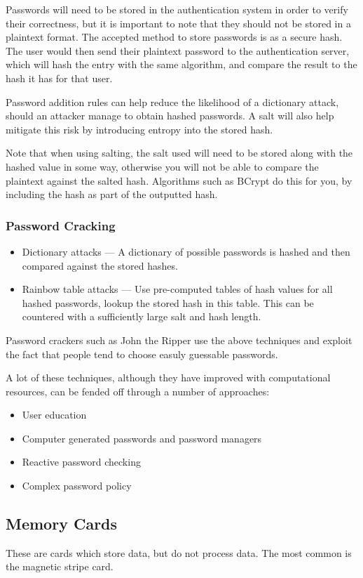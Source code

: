 Passwords will need to be stored in the authentication system in order to verify their
correctness, but it is important to note that they should not be stored in a plaintext
format. The accepted method to store passwords is as a secure hash. The user would then
send their plaintext password to the authentication server, which will hash the entry with
the same algorithm, and compare the result to the hash it has for that user.

Password addition rules can help reduce the likelihood of a dictionary attack, should an
attacker manage to obtain hashed passwords. A salt will also help mitigate this risk by 
introducing entropy into the stored hash.

Note that when using salting, the salt used will need to be stored along with the hashed value
in some way, otherwise you will not be able to compare the plaintext against the salted hash.
Algorithms such as BCrypt do this for you, by including the hash as part of the outputted hash.

\subsubsection{Password Cracking}
\begin{itemize}
	\item Dictionary attacks --- A dictionary of possible passwords is hashed and then compared against the stored hashes.
	\item Rainbow table attacks --- Use pre-computed tables of hash values for all hashed passwords, lookup the stored hash in this table. This can be countered with a sufficiently large salt and hash length.
\end{itemize}

Password crackers such as John the Ripper use the above techniques and exploit the fact that people tend to
choose easuly guessable passwords.

A lot of these techniques, although they have improved with computational resources, can be fended off through
a number of approaches:
\begin{itemize}
	\item User education
	\item Computer generated passwords and password managers
	\item Reactive password checking
	\item Complex password policy
\end{itemize}

\subsection{Memory Cards}
These are cards which store data, but do not process data. The most common is the magnetic stripe card.

